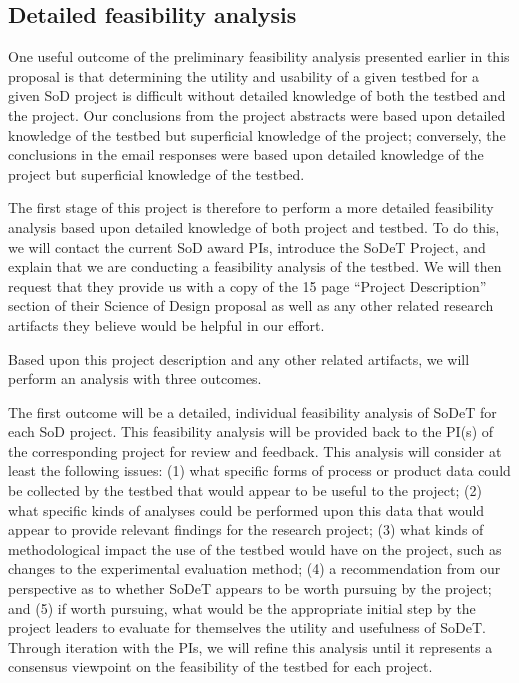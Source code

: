 \subsection{Detailed feasibility analysis}
\label{sec:detailed-study}

One useful outcome of the preliminary feasibility analysis presented 
earlier in this proposal is that determining the utility and usability
of a given testbed for a given SoD project is difficult without detailed
knowledge of both the testbed and the project.  Our conclusions from the
project abstracts were based upon detailed knowledge of the testbed but
superficial knowledge of the project; conversely, the conclusions in the
email responses were based upon detailed knowledge of the project but
superficial knowledge of the testbed. 

The first stage of this project is therefore to perform a more detailed
feasibility analysis based upon detailed knowledge of both project and
testbed.  To do this, we will contact the current SoD award PIs, introduce
the SoDeT Project, and explain that we are conducting a feasibility
analysis of the testbed. We will then request that they provide us with a
copy of the 15 page ``Project Description'' section of their Science of
Design proposal as well as any other related research artifacts they
believe would be helpful in our effort.

Based upon this project description and any other related
artifacts, we will perform an analysis with three outcomes.

The first outcome will be a detailed, individual feasibility analysis of
SoDeT for each SoD project.  This feasibility analysis will be
provided back to the PI(s) of the corresponding project for review and
feedback.  This analysis will consider at least the following issues: (1)
what specific forms of process or product data could be collected by the
testbed that would appear to be useful to the project; (2) what specific
kinds of analyses could be performed upon this data that would appear to
provide relevant findings for the research project; (3) what kinds of
methodological impact the use of the testbed would have on the project,
such as changes to the experimental evaluation method; (4) a recommendation
from our perspective as to whether SoDeT appears to be worth
pursuing by the project; and (5) if worth pursuing, what would be the
appropriate initial step by the project leaders to evaluate for themselves
the utility and usefulness of SoDeT.  Through iteration with the PIs, we
will refine this analysis until it represents a consensus viewpoint on the 
feasibility of the testbed for each project. 

